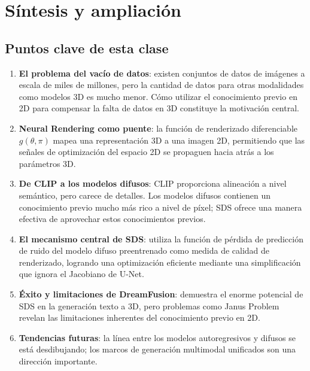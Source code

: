 \section{Síntesis y ampliación}

\subsection{Puntos clave de esta clase}

\begin{enumerate}
    \item \textbf{El problema del vacío de datos}: existen conjuntos de datos de imágenes a escala de miles de millones, pero la cantidad de datos para otras modalidades como modelos 3D es mucho menor. Cómo utilizar el conocimiento previo en 2D para compensar la falta de datos en 3D constituye la motivación central.

    \item \textbf{Neural Rendering como puente}: la función de renderizado diferenciable $g(\theta, \pi)$ mapea una representación 3D a una imagen 2D, permitiendo que las señales de optimización del espacio 2D se propaguen hacia atrás a los parámetros 3D.

    \item \textbf{De CLIP a los modelos difusos}: CLIP proporciona alineación a nivel semántico, pero carece de detalles. Los modelos difusos contienen un conocimiento previo mucho más rico a nivel de píxel; SDS ofrece una manera efectiva de aprovechar estos conocimientos previos.

    \item \textbf{El mecanismo central de SDS}: utiliza la función de pérdida de predicción de ruido del modelo difuso preentrenado como medida de calidad de renderizado, logrando una optimización eficiente mediante una simplificación que ignora el Jacobiano de U-Net.

    \item \textbf{Éxito y limitaciones de DreamFusion}: demuestra el enorme potencial de SDS en la generación texto a 3D, pero problemas como Janus Problem revelan las limitaciones inherentes del conocimiento previo en 2D.

    \item \textbf{Tendencias futuras}: la línea entre los modelos autoregresivos y difusos se está desdibujando; los marcos de generación multimodal unificados son una dirección importante.
\end{enumerate}

